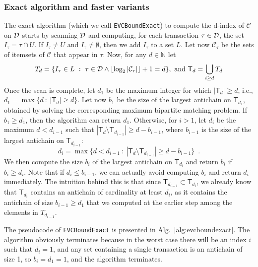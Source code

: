 \subsubsection{Exact algorithm and faster variants}\label{sec:computvcexact}
The exact algorithm (which we call \texttt{EVCBoundExact}) to compute the d-index of
$\mathcal{C}$ on ${\cal D}$ starts by scanning ${\cal D}$ and computing, for each
transaction $\tau\in{\cal D}$, the set $I_\tau=\tau\cap U$. If $I_\tau\neq U$ and
$I_\tau\neq\emptyset$, then we add $I_\tau$ to a set $L$. Let now
$\mathcal{C}_\tau$ be the sets of itemsets of $\mathcal{C}$ that appear in
$\tau$. Now, for any $d\in\mathbb{N}$ let
\[
	T_d=\{I_\tau\in L ~:~ \tau\in{\cal D} \wedge \lfloor\log_2|\mathcal{C}_\tau|\rfloor+1= d\},\mbox{ and } \mathsf{T}_d=\bigcup_{i\ge d} T_d
\]
Once the scan is complete, let $d_1$  be the maximum integer for which
$|\mathsf{T}_d|\ge d$, i.e., $d_1=\max\{d ~:~ |\mathsf{T}_d|\ge d\}$. Let now
$b_1$ be the size of the largest antichain on $\mathsf{T}_{d_1}$, obtained by
solving the corresponding maximum bipartite matching problem. If $b_1\ge d_1$,
then the algorithm can return $d_1$. Otherwise, for $i>1$, let $d_i$ be the
maximum $d<d_{i-1}$ such that $|\mathsf{T}_d\setminus\mathsf{T}_{d_{i-1}}|\ge
d-b_{i-1}$, where $b_{i-1}$ is the size of the largest antichain on
$\mathsf{T}_{d_{i-1}}$:
\[
	d_i=\max\{d<d_{i-1} ~:~ |\mathsf{T}_d\setminus\mathsf{T}_{d_{i-1}}|\ge d-b_{i-1}\}\enspace.
\]
We then compute the size $b_i$ of the largest antichain on $\mathsf{T}_{d_i}$
and return $b_i$ if $b_i\ge d_i$. Note that if $d_i\le b_{i-1}$, we can actually
avoid computing $b_i$ and return $d_i$ immediately. The intuition behind this is
that since $\mathsf{T}_{d_{i-1}} \subset \mathsf{T}_{d_{i}}$, we already know that $\mathsf{T}_{d_i}$
contains an antichain of cardinality at least $d_{i}$, as it contains the
antichain of size $b_{i-1}\ge d_1$ that we computed at the earlier step among
the elements in $T_{d_{i-1}}$.

The pseudocode of \texttt{EVCBoundExact} is presented in
Alg.~\ref{alg:evcboundexact}. The algorithm obviously terminates because in the
worst case there will be an index $i$ such that $d_i=1$, and any set containing
a single transaction is an antichain of size 1, so $b_i=d_1=1$, and the
algorithm terminates.

